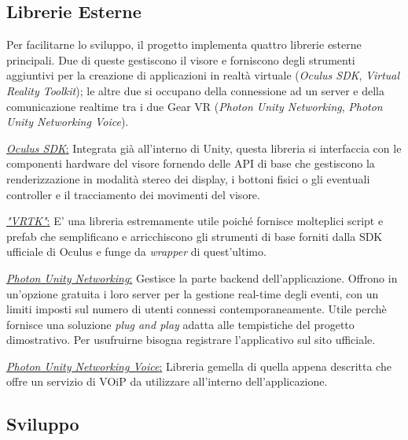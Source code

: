 \subsection{Librerie Esterne}
Per facilitarne lo sviluppo, il progetto implementa quattro librerie esterne principali. Due di queste gestiscono il visore e forniscono degli strumenti aggiuntivi per la creazione di applicazioni in realtà virtuale (\textit{Oculus SDK}, \textit{Virtual Reality Toolkit}); le altre due si occupano della connessione ad un server e della comunicazione realtime tra i due Gear VR (\textit{Photon Unity Networking}, \textit{Photon Unity Networking Voice}).\\

\begin{flushleft}
	\underline{\textit{Oculus SDK}:}
	Integrata già all'interno di Unity, questa libreria si interfaccia con le componenti hardware del visore fornendo delle API di base che gestiscono la renderizzazione in modalità stereo dei display, i bottoni fisici o gli eventuali controller e il tracciamento dei movimenti del visore. \cite{OculusDoc}
\end{flushleft}

\begin{flushleft}
	\underline{\textit{"VRTK"}:}
	E' una libreria estremamente utile poiché fornisce molteplici script e prefab che semplificano e arricchiscono gli strumenti di base forniti dalla SDK ufficiale di Oculus e funge da \textit{wrapper} di quest'ultimo.
	\cite{VRTK}
\end{flushleft}

\begin{flushleft}
	\underline{\textit{Photon Unity Networking}:}
	Gestisce la parte backend dell'applicazione. Offrono in un'opzione gratuita i loro server per la gestione real-time degli eventi, con un limiti imposti sul numero di utenti connessi contemporaneamente. Utile perchè fornisce una soluzione \textit{plug and play} adatta alle tempistiche del progetto dimostrativo. Per usufruirne bisogna registrare l'applicativo sul sito ufficiale.
	\cite{VRTK}
\end{flushleft}

\begin{flushleft}
	\underline{\textit{Photon Unity Networking Voice}:}
	Libreria gemella di quella appena descritta che offre un servizio di VOiP da utilizzare all'interno dell'applicazione.
	\cite{Photon}
\end{flushleft}
\subsection{Sviluppo}

